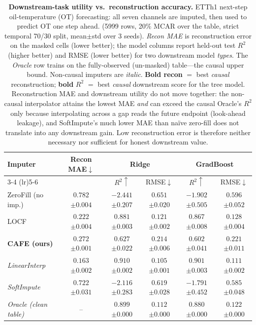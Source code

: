 \begin{table}[tbp]\centering\small
\setlength{\tabcolsep}{5pt}
\caption{\textbf{Downstream-task utility vs.\ reconstruction accuracy.} ETTh1 next-step oil-temperature (OT) forecasting: all seven channels are imputed, then used to predict OT one step ahead. (5999 rows, 20\% MCAR over the table, strict temporal 70/30 split, mean$\pm$std over 3 seeds). \emph{Recon MAE} is reconstruction error on the masked cells (lower better); the model columns report held-out test $R^2$ (higher better) and RMSE (lower better) for two downstream model \emph{types}. The \emph{Oracle} row trains on the fully-observed (un-masked) table---the causal upper bound. Non-causal imputers are \emph{italic}. \textbf{Bold recon} $=$ best \emph{causal} reconstruction; \textbf{bold }$R^2$ $=$ best \emph{causal} downstream score for the tree model. Reconstruction MAE and downstream utility do not move together: the non-causal interpolator attains the lowest MAE \emph{and} can exceed the causal Oracle's $R^2$ only because interpolating across a gap reads the future endpoint (look-ahead leakage), and SoftImpute's much lower MAE than na\"ive zero-fill does not translate into any downstream gain. Low reconstruction error is therefore neither necessary nor sufficient for honest downstream value.}
\label{tab:downstream}
\begin{tabular}{@{}l c c c c c@{}}
\toprule
Imputer & Recon MAE$\downarrow$ & \multicolumn{2}{c}{Ridge} & \multicolumn{2}{c}{GradBoost} \\
\cmidrule(lr){3-4} \cmidrule(lr){5-6}
 & & $R^2\uparrow$ & RMSE$\downarrow$ & $R^2\uparrow$ & RMSE$\downarrow$ \\
\midrule
ZeroFill (no imp.) & $0.782${\scriptsize$\pm0.004$} & $-2.441${\scriptsize$\pm0.207$} & $0.651${\scriptsize$\pm0.020$} & $-1.902${\scriptsize$\pm0.505$} & $0.596${\scriptsize$\pm0.052$} \\
LOCF & $\mathbf{0.222}${\scriptsize$\pm0.004$} & $0.881${\scriptsize$\pm0.003$} & $0.121${\scriptsize$\pm0.002$} & $\mathbf{0.867}${\scriptsize$\pm0.008$} & $0.128${\scriptsize$\pm0.004$} \\
\textbf{CAFE (ours)} & $0.272${\scriptsize$\pm0.001$} & $0.627${\scriptsize$\pm0.022$} & $0.214${\scriptsize$\pm0.006$} & $0.602${\scriptsize$\pm0.041$} & $0.221${\scriptsize$\pm0.011$} \\
\midrule
\emph{LinearInterp} & \emph{$0.163${\scriptsize$\pm0.002$}} & \emph{$0.910${\scriptsize$\pm0.002$}} & \emph{$0.105${\scriptsize$\pm0.001$}} & \emph{$0.901${\scriptsize$\pm0.003$}} & \emph{$0.111${\scriptsize$\pm0.002$}} \\
\emph{SoftImpute} & \emph{$0.722${\scriptsize$\pm0.031$}} & \emph{$-2.116${\scriptsize$\pm0.283$}} & \emph{$0.619${\scriptsize$\pm0.028$}} & \emph{$-1.791${\scriptsize$\pm0.452$}} & \emph{$0.585${\scriptsize$\pm0.048$}} \\
\midrule
\emph{Oracle (clean table)} & $\,$--$\,$ & $0.899${\scriptsize$\pm0.000$} & $0.112${\scriptsize$\pm0.000$} & $0.880${\scriptsize$\pm0.000$} & $0.122${\scriptsize$\pm0.000$} \\
\bottomrule
\end{tabular}
\end{table}
